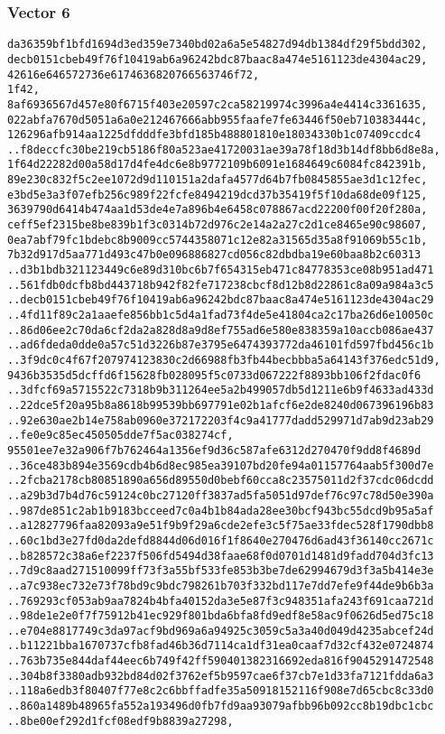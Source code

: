 \documentclass[
]{article}
\begin{document}
\hypertarget{vector-6-2}{%
\subsubsection{Vector 6}\label{vector-6-2}}

\begin{verbatim}
da36359bf1bfd1694d3ed359e7340bd02a6a5e54827d94db1384df29f5bdd302,
decb0151cbeb49f76f10419ab6a96242bdc87baac8a474e5161123de4304ac29,
42616e646572736e6174636820766563746f72,
1f42,
8af6936567d457e80f6715f403e20597c2ca58219974c3996a4e4414c3361635,
022abfa7670d5051a6a0e212467666abb955faafe7fe63446f50eb710383444c,
126296afb914aa1225dfdddfe3bfd185b488801810e18034330b1c07409ccdc4
..f8deccfc30be219cb5186f80a523ae41720031ae39a78f18d3b14df8bb6d8e8a,
1f64d22282d00a58d17d4fe4dc6e8b9772109b6091e1684649c6084fc842391b,
89e230c832f5c2ee1072d9d110151a2dafa4577d64b7fb0845855ae3d1c12fec,
e3bd5e3a3f07efb256c989f22fcfe8494219dcd37b35419f5f10da68de09f125,
3639790d6414b474aa1d53de4e7a896b4e6458c078867acd22200f00f20f280a,
ceff5ef2315be8be839b1f3c0314b72d976c2e14a2a27c2d1ce8465e90c98607,
0ea7abf79fc1bdebc8b9009cc5744358071c12e82a31565d35a8f91069b55c1b,
7b32d917d5aa771d493c47b0e096886827cd056c82dbdba19e60baa8b2c60313
..d3b1bdb321123449c6e89d310bc6b7f654315eb471c84778353ce08b951ad471
..561fdb0dcfb8bd443718b942f82fe717238cbcf8d12b8d22861c8a09a984a3c5
..decb0151cbeb49f76f10419ab6a96242bdc87baac8a474e5161123de4304ac29
..4fd11f89c2a1aaefe856bb1c5d4a1fad73f4de5e41804ca2c17ba26d6e10050c
..86d06ee2c70da6cf2da2a828d8a9d8ef755ad6e580e838359a10accb086ae437
..ad6fdeda0dde0a57c51d3226b87e3795e6474393772da46101fd597fbd456c1b
..3f9dc0c4f67f207974123830c2d66988fb3fb44becbbba5a64143f376edc51d9,
9436b3535d5dcffd6f15628fb028095f5c0733d067222f8893bb106f2fdac0f6
..3dfcf69a5715522c7318b9b311264ee5a2b499057db5d1211e6b9f4633ad433d
..22dce5f20a95b8a8618b99539bb697791e02b1afcf6e2de8240d067396196b83
..92e630ae2b14e758ab0960e372172203f4c9a41777dadd529971d7ab9d23ab29
..fe0e9c85ec450505dde7f5ac038274cf,
95501ee7e32a906f7b762464a1356ef9d36c587afe6312d270470f9dd8f4689d
..36ce483b894e3569cdb4b6d8ec985ea39107bd20fe94a01157764aab5f300d7e
..2fcba2178cb80851890a656d89550d0bebf60cca8c23575011d2f37cdc06dcdd
..a29b3d7b4d76c59124c0bc27120ff3837ad5fa5051d97def76c97c78d50e390a
..987de851c2ab1b9183bcceed7c0a4b1b84ada28ee30bcf943bc55dcd9b95a5af
..a12827796faa82093a9e51f9b9f29a6cde2efe3c5f75ae33fdec528f1790dbb8
..60c1bd3e27fd0da2defd8844d06d016f1f8640e270476d6ad43f36140cc2671c
..b828572c38a6ef2237f506fd5494d38faae68f0d0701d1481d9fadd704d3fc13
..7d9c8aad271510099ff73f3a55bf533fe853b3be7de62994679d3f3a5b414e3e
..a7c938ec732e73f78bd9c9bdc798261b703f332bd117e7dd7efe9f44de9b6b3a
..769293cf053ab9aa7824b4bfa40152da3e5e87f3c948351afa243f691caa721d
..98de1e2e0f7f75912b41ec929f801bda6bfa8fd9edf8e58ac9f0626d5ed75c18
..e704e8817749c3da97acf9bd969a6a94925c3059c5a3a40d049d4235abcef24d
..b11221bba1670737cfb8fad46b36d7114ca1df31ea0caaf7d32cf432e0724874
..763b735e844daf44eec6b749f42ff590401382316692eda816f9045291472548
..304b8f3380adb932bd84d02f3762ef5b9597cae6f37cb7e1d33fa7121fdda6a3
..118a6edb3f80407f77e8c2c6bbffadfe35a50918152116f908e7d65cbc8c33d0
..860a1489b48965fa552a193496d0fb7fd9aa93079afbb96b092cc8b19dbc1cbc
..8be00ef292d1fcf08edf9b8839a27298,
\end{verbatim}
\end{document}
